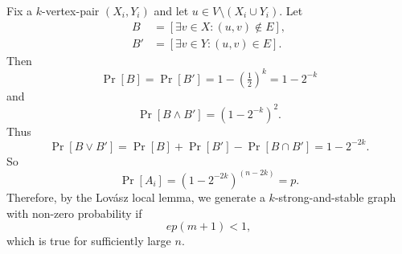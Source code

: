 \begin{subparts}
\begin{solution}
        Fix a $k$-vertex-pair $(X_i, Y_i)$ and let $u \in V \setminus (X_i \cup Y_i)$. Let
        \begin{align*}
            B &= [\exists v \in X: (u,v) \not\in E], \\
            B' &= [\exists v \in Y: (u,v) \in E].
        \end{align*}
        Then
        \[
            \Pr[B] = \Pr[B'] = 1 - \left(\tfrac12\right)^k = 1 - 2^{-k}
        \]
        and
        \[
            \Pr[B \land B'] = \left(1 - 2^{-k}\right)^2.
        \]
        Thus
        \[ \Pr[B \lor B'] = \Pr[B] + \Pr[B'] - \Pr[B \cap B'] = 1 - 2^{-2k}. \]
        So
        \[ \Pr[A_i] = (1 - 2^{-2k})^{(n-2k)} = p. \]
        Therefore, by the Lov\'asz local lemma, we generate a $k$-strong-and-stable graph with non-zero probability if
        \[ ep(m+1) < 1, \]
        which is true for sufficiently large $n$.
    \end{solution}
\end{subparts}